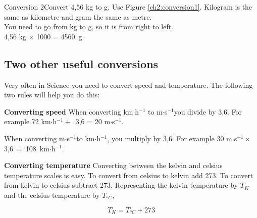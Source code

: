     \noindent
\par
\begin{wex}{Conversion 2}{Convert 4,56 kg to g.}
{
Use Figure \ref{ch2:conversion1}. Kilogram is the same as kilometre and gram the same as metre.\\
You need to go from kg to g, so it is from right to left.\\
4,56 kg $\times$ 1000 = 4560~$\text{g}$}
\end{wex}
    \noindent
      \label{m30853*uid57}
            \subsection{ Two other useful conversions}
            \nopagebreak
        \label{m30853*id67266}Very often in Science you need to convert speed and temperature. The following two rules will help you do this:\par 
        \label{m30853*id67270}\textbf{Converting speed}
When converting km$\ensuremath{\cdot}$h${}^{-1}$ to m$\ensuremath{\cdot}$s${}^{-1}$you divide by 3,6. For example 72 km$\ensuremath{\cdot}$h${}^{-1}\div$~3,6 = 20 m$\ensuremath{\cdot}$s${}^{-1}$.\par 
        \label{m30853*id67389}When converting m$\ensuremath{\cdot}$s${}^{-1}$to km$\ensuremath{\cdot}$h${}^{-1}$, you multiply by 3,6. For example 30 m$\ensuremath{\cdot}$s${}^{-1}\ensuremath{\times}$3,6~=~108~km$\ensuremath{\cdot}$h${}^{-1}$.\par 
        \label{m30853*id67500}\textbf{Converting temperature}
Converting between the kelvin and celsius temperature scales is easy. To convert from celsius to kelvin add 273. To convert from kelvin to celsius subtract 273. Representing the kelvin temperature by ${T}_{K}$ and the celsius temperature by ${T}_{{}^{o}C}$,\par 
        \label{m30853*id67545}\nopagebreak\noindent{}
          
    \begin{equation}
    {T}_{K}={T}_{{}^{o}C}+273\tag{6}
      \end{equation}
